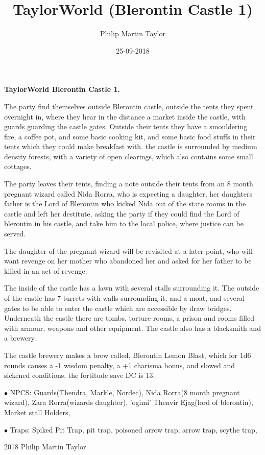 \documentclass[12pt,a4paper]{book}
\date{25-09-2018}
\author{Philip Martin Taylor}
\title{TaylorWorld (Blerontin Castle 1)}
\begin{document}
\begin{center}
\textbf{TaylorWorld\texttrademark \: Blerontin Castle 1.}
\end{center}
\begin{flushleft}
  The party find themselves outside Blerontin castle, outside the tents they spent overnight in, where they hear in the distance a market inside the castle, with guards guarding the castle gates. Outside their tents they have a smouldering fire, a coffee pot, and some basic cooking kit, and some basic food stuffs in their tents which they could make breakfast with. the castle is surrounded by medium density forests, with a variety of open clearings, which also contains some small cottages.
\end{flushleft}
\begin{flushleft}
  The party leaves their tents, finding a note outside their tents from an 8 month pregnant wizard called Nida Rorra, who is expecting a daughter, her daughters father is the Lord of Blerontin who kicked Nida out of the state rooms in the castle and left her destitute, asking the party if they could find the Lord of blerontin in his castle, and take him to the local police, where justice can be served.
\end{flushleft}
\begin{flushleft}
  The daughter of the pregnant wizard will be revisited at a later point, who will want revenge on her mother who abandoned her and asked for her father to be killed in an act of revenge.
\end{flushleft}
\begin{flushleft}
  The inside of the castle has a lawn with several stalls surrounding it. The outside of the castle has 7 turrets with walls surrounding it, and a moat, and several gates to be able to enter the castle which are accessible by draw bridges. Underneath the castle there are tombs, torture rooms, a prison and rooms filled with armour, weapons and other equipment. The castle also has a blacksmith and a brewery.
\end{flushleft}
\begin{flushleft}
  The castle brewery makes a brew called, Blerontin Lemon Blast, which for 1d6 rounds causes a -1 wisdom penalty, a +1 charisma bonus, and slowed and sickened conditions, the fortitude save DC is 13.
\end{flushleft}
\begin{flushleft}
\item[$\bullet$ NPCS:] Guards(Thendra, Markle, Nordec), Nida Rorra(8 month pregnant wizard), Zara Rorra(wizards daughter), 'ogimi' Thenvir Ejag(lord of blerontin), Market stall Holders, 
  \item[$\bullet$ Traps:] Spiked Pit Trap, pit trap, poisoned arrow trap, arrow trap, scythe trap, 
\end{flushleft}
\begin{center}
  \textcopyright{} 2018 Philip Martin Taylor
\end{center}
\end{document}
